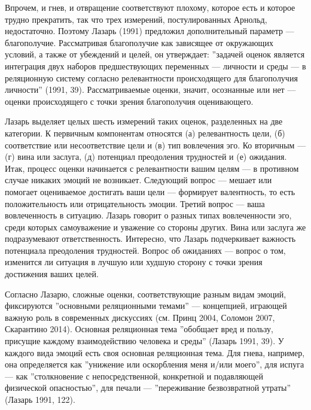 \documentclass[11pt]{book}
\begin{document}
Впрочем, и гнев, и отвращение соответствуют плохому, которое есть и которое трудно прекратить, так что трех измерений, постулированных Арнольд, недостаточно. Поэтому Лазарь (1991) предложил дополнительный параметр --- благополучие. Рассматривая благополучие как зависящее от окружающих условий, а также от убеждений и целей, он утверждает: ''задачей оценок является интеграция двух наборов предшествующих переменных --- личности и среды --- в реляционную систему согласно релевантности происходящего для благополучия личности'' (1991, 39). Рассматриваемые оценки, значит, осознанные или нет --- оценки происходящего с точки зрения благополучия оценивающего.

Лазарь выделяет целых шесть измерений таких оценок, разделенных на две категории. К первичным компонентам относятся (а) релевантность цели, (б) соответствие или несоответствие цели и (в) тип вовлечения эго. Ко вторичным --- (г) вина или заслуга, (д) потенциал преодоления трудностей и (е) ожидания. Итак, процесс оценки начинается с релевантности вашим целям --- в противном случае никаких эмоций не возникает. Следующий вопрос --- мешает или помогает оцениваемое достигать ваши цели --- формирует валентность, то есть положительность или отрицательность эмоции. Третий вопрос --- ваша вовлеченность в ситуацию. Лазарь говорит о разных типах вовлеченности эго, среди которых самоуважение и уважение со стороны других. Вина или заслуга же подразумевают ответственность. Интересно, что Лазарь подчеркивает важность потенциала преодоления трудностей. Вопрос об ожиданиях --- вопрос о том, изменится ли ситуация в лучшую или худшую сторону с точки зрения достижения ваших целей.

Согласно Лазарю, сложные оценки, соответствующие разным видам эмоций, фиксируются ''основными реляционными темами'' --- концепцией, играющей важную роль в современных дискуссиях (см. Принц 2004, Соломон 2007, Скарантино 2014). Основная реляционная тема ''обобщает вред и пользу, присущие каждому взаимодействию человека и среды'' (Лазарь 1991, 39). У каждого вида эмоций есть своя основная реляционная тема. Для гнева, например, она определяется как ''унижение или оскорбления меня и/или моего'', для испуга --- как ''столкновение с непосредственной, конкретной и подавляющей физической опасностью'', для печали --- ''переживание безвозвратной утраты'' (Лазарь 1991, 122).
\end{document}
